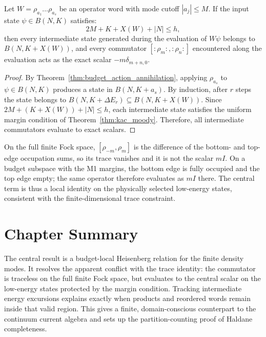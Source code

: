 \begin{theorem}
\label{thm:excursion_accounting}
Let $W = \rho_{a_1} \dots \rho_{a_s}$ be an operator word with mode cutoff $|a_j| \le M$. If the input state $\psi \in B(N, K)$ satisfies:
\begin{equation}
2M + K + X(W) + |N| \le h,
\end{equation}
then every intermediate state generated during the evaluation of $W \psi$ belongs to $B(N, K + X(W))$, and every commutator $[:\!\rho_m\!:, :\!\rho_n\!:]$ encountered along the evaluation acts as the exact scalar $-m \delta_{m+n, 0}$.
\end{theorem}

\begin{proof}
By Theorem~\ref{thm:budget_action_annihilation}, applying $\rho_{a_s}$ to $\psi \in B(N, K)$ produces a state in $B(N, K + a_s)$. By induction, after $r$ steps the state belongs to $B(N, K + \Delta E_r) \subseteq B(N, K + X(W))$.
Since $2M + (K + X(W)) + |N| \le h$, each intermediate state satisfies the uniform margin condition of Theorem~\ref{thm:kac_moody}. Therefore, all intermediate commutators evaluate to exact scalars.
\end{proof}

\begin{remark}
On the full finite Fock space, $[\rho_{-m},\rho_m]$ is the difference of the bottom- and top-edge occupation sums, so its trace vanishes and it is not the scalar $mI$. On a budget subspace with the M1 margins, the bottom edge is fully occupied and the top edge empty; the same operator therefore evaluates as $mI$ there. The central term is thus a local identity on the physically selected low-energy states, consistent with the finite-dimensional trace constraint.
\end{remark}

\section{Chapter Summary}
The central result is a budget-local Heisenberg relation for the finite
density modes. It resolves the apparent conflict with the trace identity:
the commutator is traceless on the full finite Fock space, but evaluates to
the central scalar on the low-energy states protected by the margin
condition. Tracking intermediate energy excursions explains exactly when
products and reordered words remain inside that valid region. This gives a
finite, domain-conscious counterpart to the continuum current algebra and
sets up the partition-counting proof of Haldane completeness.
